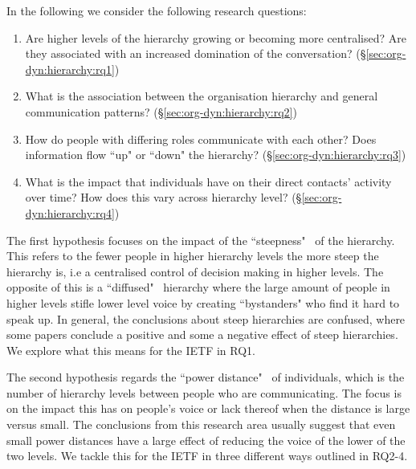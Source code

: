 \documentclass[twocolumn,10pt]{article}
\begin{document}
In the following we consider the following research questions: 
\begin{enumerate}
  \item
    Are higher levels of the hierarchy growing or becoming more
    centralised? Are they associated with an increased domination
    of the conversation?
    (\S\ref{sec:org-dyn:hierarchy:rq1})

  \item
    What is the association between the organisation hierarchy and general
    communication patterns?
    (\S\ref{sec:org-dyn:hierarchy:rq2})

  \item
    How do people with differing roles communicate with each other?  Does
    information flow ``up" or ``down" the hierarchy?
    (\S\ref{sec:org-dyn:hierarchy:rq3})

  \item
    What is the impact that individuals have on their direct contacts'
    activity over time? How does this vary across hierarchy level?
    (\S\ref{sec:org-dyn:hierarchy:rq4})

\end{enumerate}

The first hypothesis focuses on the impact of the
``steepness"~\cite{anderson2010functions} of the hierarchy. This refers to
the fewer people in higher hierarchy levels the more steep the hierarchy
is, i.e a centralised control of decision making in higher levels. The
opposite of this is a ``diffused"~\cite{hussain2019voice} hierarchy where
the large amount of people in higher levels stifle lower level voice by
creating ``bystanders" who find it hard to speak up. In general, the
conclusions about steep hierarchies are confused, where some papers
conclude a positive and some a negative effect of steep hierarchies. We
explore what this means for the IETF in RQ1.

The second hypothesis regards the ``power
distance"~\cite{li2021does,duan2018authoritarian,guo2020inclusive} of
individuals, which is the number of hierarchy levels between people who are
communicating. The focus is on the impact this has on people's voice or
lack thereof when the distance is large versus small. The conclusions from
this research area usually suggest that even small power distances have a
large effect of reducing the voice of the lower of the two levels. We
tackle this for the IETF in three different ways outlined in RQ2-4.
\end{document}
